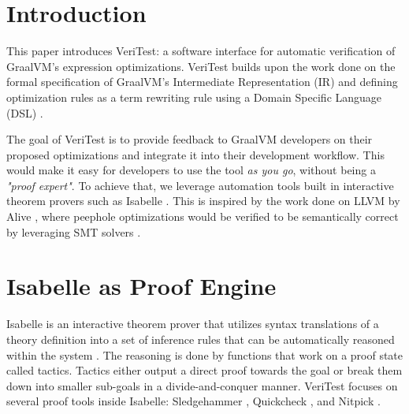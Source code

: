 \documentclass[conference,a4paper,english,10pt]{IEEEtran}[2015/08/26]
\begin{document}
\section{Introduction}
\label{sec:introduction}



This paper introduces VeriTest: a software interface for automatic verification of GraalVM's expression optimizations. 
VeriTest builds upon the work done on 
the formal specification of GraalVM's Intermediate Representation (IR) \cite{ATVA21_GraalVM_IR_Semantics} and defining optimization rules as a term 
rewriting rule using a Domain Specific Language (DSL) \cite{Term_Graph_Optimizations}. 

The goal of VeriTest is to provide feedback to GraalVM \cite{graal} developers on their proposed optimizations and integrate it into their 
development workflow. This would make it easy for developers to use the tool \emph{as you go}, without being a \emph{"proof expert"}.
To achieve that, we leverage automation tools built in interactive theorem provers such as Isabelle \cite{isabelleProof}.
This is inspired by the work done on LLVM by Alive \cite{AliveInLean}, where peephole optimizations would be verified to be semantically 
correct by leveraging SMT solvers \cite[Sec. 3.1.1]{AliveInLean}.

\section{Isabelle as Proof Engine}
\label{sec:Isabelle}

Isabelle is an interactive theorem prover that utilizes syntax translations of a theory definition into a set of inference rules that can be 
automatically reasoned within the system \cite{isabelleProof}. The reasoning is done by functions that work on a proof state called tactics. 
Tactics either output a direct proof towards the goal or break them down into smaller sub-goals in a divide-and-conquer manner. VeriTest focuses 
on several proof tools inside Isabelle: Sledgehammer \cite[Sec. 3]{isabelleProof}, Quickcheck \cite[Sec. 4]{isabelleProof}, 
and Nitpick \cite[Sec. 5]{isabelleProof}.
\end{document}
